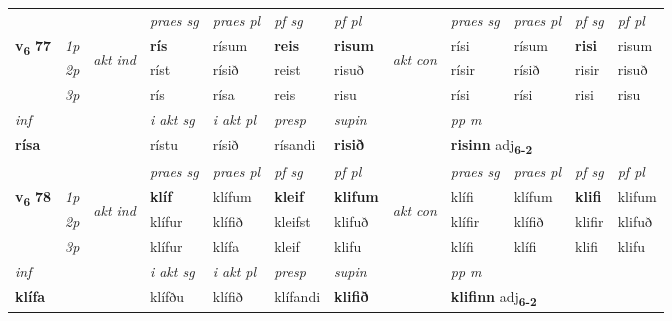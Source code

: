 \begin{longtable}[l]{X>{\footnotesize\itshape}llXXXXlXXXX}
 & &   & \textit{praes sg}  & \textit{praes pl}    & \textit{ pf sg} & \textit{pf pl} & & \textit{praes sg}  & \textit{praes pl}    & \textit{pf sg} & \textit{pf pl }  \\ \cmidrule{4-7} \cmidrule{9-12}
 \multirow{2}{*}{{{\textbf{v{\textsubscript{6}}} \Large{\textbf{77}}}}}  & 1p & \multirow{3}{*}{\begin{turn}{90}\textit{akt ind}\end{turn}} & \textbf{rís} & rísum & \textbf{reis} & \textbf{risum} & \multirow{3}{*}{\begin{turn}{90}\textit{akt con}\end{turn}} &rísi & rísum & \textbf{risi} & risum\\*
 & 2p &  &  ríst  & rísið & reist & risuð & & rísir & rísið & risir & risuð \\*
 & 3p &  & rís & rísa & reis & risu & & rísi & rísi& risi & risu \\*
\cmidrule{4-7} \cmidrule{9-12}

   {\textit{inf}} & &  & \textit{i akt sg} & \textit{i akt pl}   & \textit{presp} & \textit{supin}  && \textit{pp m} \\*
  {\textbf{rísa}} & && rístu  & rísið   & rísandi &  \textbf{risið}  && \multicolumn{2}{l}{\textbf{risinn} adj\textbf{\textsubscript{6-2}}} \\*

\midrule

 & &   & \textit{praes sg}  & \textit{praes pl}    & \textit{ pf sg} & \textit{pf pl} & & \textit{praes sg}  & \textit{praes pl}    & \textit{pf sg} & \textit{pf pl }  \\ \cmidrule{4-7} \cmidrule{9-12}
 \multirow{2}{*}{{{\textbf{v{\textsubscript{6}}} \Large{\textbf{78}}}}}  & 1p & \multirow{3}{*}{\begin{turn}{90}\textit{akt ind}\end{turn}} & \textbf{klíf} & klífum & \textbf{kleif} & \textbf{klifum} & \multirow{3}{*}{\begin{turn}{90}\textit{akt con}\end{turn}} &klífi & klífum & \textbf{klifi} & klifum\\*
 & 2p &  &  klífur  & klífið & kleifst & klifuð & & klífir & klífið & klifir & klifuð \\*
 & 3p &  & klífur & klífa & kleif & klifu & & klífi & klífi& klifi & klifu \\*
\cmidrule{4-7} \cmidrule{9-12}

   {\textit{inf}} & &  & \textit{i akt sg} & \textit{i akt pl}   & \textit{presp} & \textit{supin}  && \textit{pp m} \\*
  {\textbf{klífa}} & && klífðu  & klífið   & klífandi &  \textbf{klifið}  && \multicolumn{2}{l}{\textbf{klifinn} adj\textbf{\textsubscript{6-2}}} \\*


\end{longtable}
